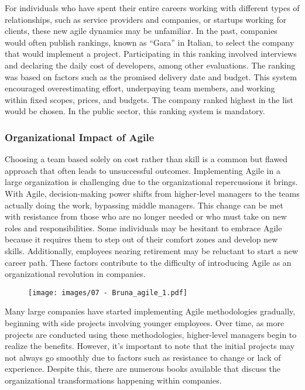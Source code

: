 For individuals who have spent their entire careers working with
different types of relationships, such as service providers and
companies, or startups working for clients, these new agile dynamics may
be unfamiliar. In the past, companies would often publish rankings,
known as ``Gara'' in Italian, to select the company that would implement
a project. Participating in this ranking involved interviews and
declaring the daily cost of developers, among other evaluations. The
ranking was based on factors such as the promised delivery date and
budget. This system encouraged overestimating effort, underpaying team
members, and working within fixed scopes, prices, and budgets. The
company ranked highest in the list would be chosen. In the public
sector, this ranking system is mandatory.

\subsubsection{Organizational Impact of Agile}

Choosing a team based solely on cost rather than skill is a common but
flawed approach that often leads to unsuccessful outcomes. Implementing
Agile in a large organization is challenging due to the organizational
repercussions it brings. With Agile, decision-making power shifts from
higher-level managers to the teams actually doing the work, bypassing
middle managers. This change can be met with resistance from those who
are no longer needed or who must take on new roles and responsibilities.
Some individuals may be hesitant to embrace Agile because it requires
them to step out of their comfort zones and develop new skills.
Additionally, employees nearing retirement may be reluctant to start a
new career path. These factors contribute to the difficulty of
introducing Agile as an organizational revolution in companies.

\begin{figure}[!h]
    \centering
    \texttt{[image: images/07 - Bruna\_agile\_1.pdf]}
\end{figure}

Many large companies have started implementing Agile methodologies
gradually, beginning with side projects involving younger employees.
Over time, as more projects are conducted using these methodologies,
higher-level managers begin to realize the benefits. However, it's
important to note that the initial projects may not always go smoothly
due to factors such as resistance to change or lack of experience.
Despite this, there are numerous books available that discuss the
organizational transformations happening within companies.

